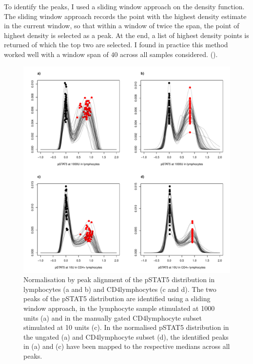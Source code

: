 To identify the peaks, I used a sliding window approach on the density function.
The sliding window approach records the point with the highest density estimate in the current window,
so that within a window of twice the span, the point of highest density is selected as a peak.
At the end, a list of highest density points is returned of which the top two are selected.
I found in practice this method worked well with a window span of $40$ across all samples considered.
().
\begin{figure}[h]
    \centering
    \includegraphics[scale=.5]{IL2/figures/pstat5-peak-normalisation.pdf}
    {Normalisation by peak alignment of the pSTAT5 distribution in lymphocytes (a and b) and CD4\positive lymphocytes (c and d).}
    {
      The two peaks of the pSTAT5 distribution are identified using a sliding window approach,
      in the lymphocyte sample stimulated at 1000 units (a) and in the manually gated CD4\positive lymphocyte subset stimulated at 10 units (c).
      In the normalised pSTAT5 distribution in the ungated (a) and CD4\positive lymphocyte subset (d),
      the identified peaks in (a) and (c) have been mapped to the respective medians across all peaks.
    }
\end{figure} 
